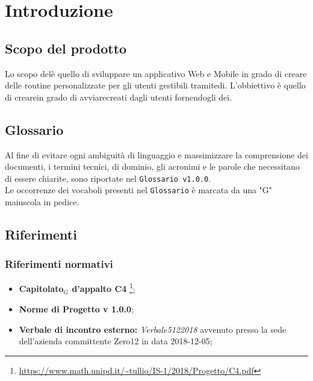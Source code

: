\chapter{Introduzione}

\section{Scopo del prodotto}
Lo scopo delè quello di sviluppare un applicativo Web e Mobile in grado di creare delle routine personalizzate per gli utenti gestibili tramitedi. L'obbiettivo è quello di crearein grado di avviarecreati dagli utenti fornendogli dei.
\section{Glossario}
Al fine di evitare ogni ambiguità di linguaggio e massimizzare la comprensione dei documenti, i termini tecnici, di dominio, gli acronimi e le parole che necessitano di essere chiarite, sono riportate nel \texttt{Glossario v1.0.0}.\\
Le occorrenze dei vocaboli presenti nel \texttt{Glossario} è marcata da una "G" maiuscola in pedice.

\section{Riferimenti}

\subsection{Riferimenti normativi}
\begin{itemize}
	
	\item \textbf{Capitolato$_{G}$ d'appalto C4} \footnote{\url{https://www.math.unipd.it/~tullio/IS-1/2018/Progetto/C4.pdf}};
	\item \textbf{Norme di Progetto v 1.0.0};
	\item \textbf{Verbale di incontro esterno:} \textit{Verbale5122018} avvenuto presso la sede dell'azienda committente Zero12 in data 2018-12-05;

\end{itemize}

